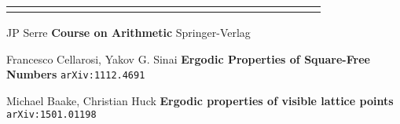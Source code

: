 \documentclass[12pt]{article}
\begin{document}
{\begin{tabular}{rrrrrrrrrrrrrrrrrrrrrrrrr}
{\color{blue!80!white}{$\circ$}} & {\color{blue!80!white}{$\circ$}} & {\color{blue!80!white}{$\circ$}} & {\color{blue!80!white}{$\circ$}} & {\color{red!80!white}{$\circ$}} & {\color{blue!80!white}{$\circ$}} & {\color{red!80!white}{$\circ$}} & {\color{blue!80!white}{$\circ$}} & {\color{blue!80!white}{$\circ$}} & {\color{blue!80!white}{$\circ$}} & {\color{red!80!white}{$\circ$}} & {\color{blue!80!white}{$\circ$}} & {\color{red!80!white}{$\circ$}} & {\color{blue!80!white}{$\circ$}} & {\color{blue!80!white}{$\circ$}} & {\color{blue!80!white}{$\circ$}} & {\color{red!80!white}{$\circ$}} & {\color{blue!80!white}{$\circ$}} & {\color{blue!80!white}{$\circ$}} & {\color{blue!80!white}{$\circ$}} & {\color{blue!80!white}{$\circ$}} & {\color{blue!80!white}{$\circ$}} & {\color{red!80!white}{$\circ$}} & {\color{blue!80!white}{$\circ$}} & {\color{red!80!white}{$\circ$}}\end{tabular}

}


\newpage

\selectfont \fontsize{12}{10}\selectfont

\begin{thebibliography}{}

\item JP Serre \textbf{Course on Arithmetic} Springer-Verlag
\item Francesco Cellarosi, Yakov G. Sinai \textbf{Ergodic Properties of Square-Free Numbers} \texttt{arXiv:1112.4691}
\item Michael Baake, Christian Huck \textbf{Ergodic properties of visible lattice points} \texttt{arXiv:1501.01198}



\end{thebibliography}
\end{document}
